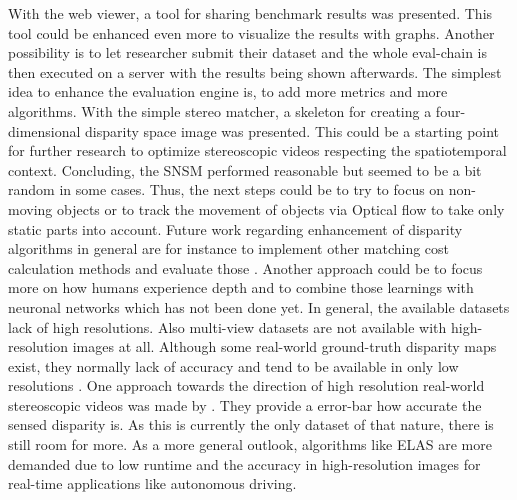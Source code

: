With the web viewer, a tool for sharing benchmark results was presented.
This tool could be enhanced even more to visualize the results with graphs.
Another possibility is to let researcher submit their dataset and the whole eval-chain is then executed on a server with the results being shown afterwards.
The simplest idea to enhance the evaluation engine is, to add more metrics and more algorithms.
\newline\newline\noindent With the simple stereo matcher, a skeleton for creating a four-dimensional disparity space image was presented.
This could be a starting point for further research to optimize stereoscopic videos respecting the spatiotemporal context.
Concluding, the SNSM performed reasonable but seemed to be a bit random in some cases.
Thus, the next steps could be to try to focus on non-moving objects or to track the movement of objects via Optical flow to take only static parts into account.
\newline\newline\noindent Future work regarding enhancement of disparity algorithms in general are for instance to implement other matching cost calculation methods and evaluate those \citep{hermann2010gradient}.
Another approach could be to focus more on how humans experience depth \citep{deangelis1995neuronal} and to combine those learnings with neuronal networks \citep{olshausen1996emergence} which has not been done yet.
\newline\newline\noindent In general, the available datasets lack of high resolutions.
Also multi-view datasets are not available with high-resolution images at all.
Although some real-world ground-truth disparity maps exist, they normally lack of accuracy and tend to be available in only low resolutions \citep{Geiger2011IV}.
One approach towards the direction of high resolution real-world stereoscopic videos was made by \citeauthor{kondermann2015stereo} \citep{kondermann2015stereo}.
They provide a error-bar how accurate the sensed disparity is.
As this is currently the only dataset of that nature, there is still room for more.
\newline\newline\noindent As a more general outlook, algorithms like ELAS \citep{Geiger2010ACCV} are more demanded due to low runtime and the accuracy in high-resolution images for real-time applications like autonomous driving.
